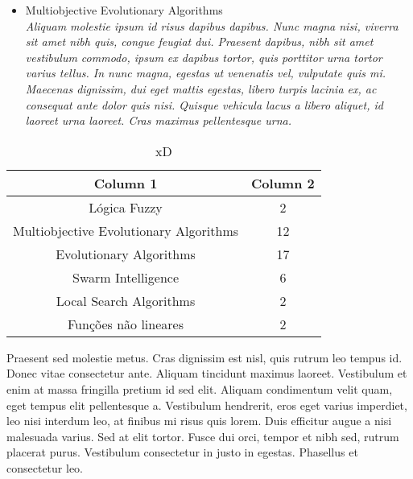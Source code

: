 \documentclass[12pt]{article}
\begin{document}
\begin{itemize}
        \item Multiobjective Evolutionary Algorithms \\
            
            \textit{Aliquam molestie ipsum id risus dapibus dapibus. Nunc magna nisi, viverra sit amet nibh quis, congue feugiat dui. Praesent dapibus, nibh sit amet vestibulum commodo, ipsum ex dapibus tortor, quis porttitor urna tortor varius tellus. In nunc magna, egestas ut venenatis vel, vulputate quis mi. Maecenas dignissim, dui eget mattis egestas, libero turpis lacinia ex, ac consequat ante dolor quis nisi. Quisque vehicula lacus a libero aliquet, id laoreet urna laoreet. Cras maximus pellentesque urna.} \\
    


    \end{itemize}



    \begin{table}[h]
        \centering
        \begin{tabular}{|c|c|}
            \hline
            \textbf{Column 1} & \textbf{Column 2} \\ \hline
            Lógica Fuzzy & 2 \\\hline
            Multiobjective Evolutionary Algorithms & 12 \\\hline
            Evolutionary Algorithms & 17 \\\hline
            Swarm Intelligence & 6 \\\hline
            Local Search Algorithms & 2 \\\hline
            Funções não lineares & 2 \\\hline
                
            \hline
        \end{tabular}
        \caption{xD}
    \end{table}


    Praesent sed molestie metus. Cras dignissim est nisl, quis rutrum leo tempus id. Donec vitae consectetur ante. Aliquam tincidunt maximus laoreet. Vestibulum et enim at massa fringilla pretium id sed elit. Aliquam condimentum velit quam, eget tempus elit pellentesque a. Vestibulum hendrerit, eros eget varius imperdiet, leo nisi interdum leo, at finibus mi risus quis lorem. Duis efficitur augue a nisi malesuada varius. Sed at elit tortor. Fusce dui orci, tempor et nibh sed, rutrum placerat purus. Vestibulum consectetur in justo in egestas. Phasellus et consectetur leo.
    
\end{document}
